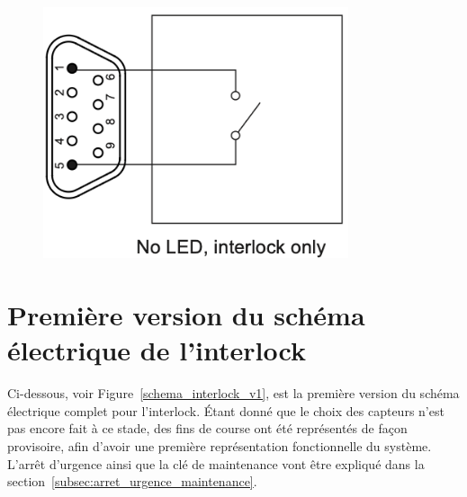 \begin{minipage}[c]{0.35\textwidth}
    \begin{figure}[H]
        \begin{center}
            \includegraphics[width=0.8\textwidth]{assets/figures/Protections_laser/Securite_electrique/interlock_only.png}
        \end{center}
        \label{Interlock_only}
    \end{figure}
\end{minipage}

\newpage
\section{Première version du schéma électrique de l'interlock}
Ci-dessous, voir Figure~\ref{schema_interlock_v1}, est la première version du schéma électrique complet pour l'interlock. Étant donné que le choix des capteurs n'est pas encore fait à ce stade, des fins de course ont été représentés de façon provisoire, afin d'avoir une première représentation fonctionnelle du système. L'arrêt d'urgence ainsi que la clé de maintenance vont être expliqué dans la section~\ref{subsec:arret_urgence_maintenance}.

